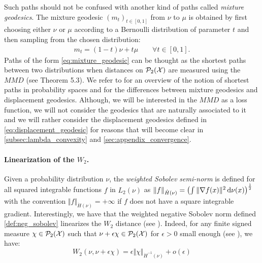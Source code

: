 \begin{remark}
	Such paths should not be confused with another kind of paths called \textit{mixture geodesics}. The mixture geodesic $(m_t)_{t\in[0,1]}$ from $\nu$ to $\mu$ is obtained by first choosing either $\nu$ or $\mu$ according to a Bernoulli distribution of parameter $t$ and then sampling from the chosen distribution:
	\begin{align}\label{eq:mixture_geodesic}
	m_t = (1-t)\nu + t\mu \qquad \forall t \in [0,1].
	\end{align}
	Paths of the form \cref{eq:mixture_geodesic} can be thought as the shortest paths between two distributions when distances on $\mathcal{P}_2({{\mathcal X}})$ are measured using the $MMD$ (see \cite{Bottou:2017} Theorem 5.3). We refer to \cite{Bottou:2017} for an overview of the notion of shortest paths in probability spaces and for the differences between mixture geodesics and displacement geodesics.
	Although, we will be interested in the $MMD$ as a loss function, we will not consider the geodesics that are naturally associated to it and we will rather consider the displacement geodesics defined in \cref{eq:displacement_geodesic} for reasons that will become clear in \cref{subsec:lambda_convexity} and \cref{sec:appendix_convergence}.
\end{remark}


\paragraph{Linearization of the $W_2$.} Given a probability distribution $\nu$, the \textit{weighted Sobolev semi-norm} is defined for all squared integrable functions $f$ in $L_2(\nu)$ as $ \Vert f \Vert_{\dot{H}(\nu)} = \left(\int \Vert \nabla f(x) \Vert^2 \mathop{}\!\mathrm{d} \nu(x) \right)^{\frac{1}{2}}$ with the convention $\Vert f \Vert_{\dot{H}(\nu)} = +\infty$ if $f$ does not have a square integrable gradient. Interestingly, we have that the weighted negative Sobolev norm defined \cref{def:neg_sobolev} linearizes the $W_2$ distance (see \cite{Villani:2009}). Indeed, for any finite signed measure $\chi\in\mathcal{P}_2({{\mathcal X}})$ such that $\nu + \epsilon \chi \in {{\mathcal P}}_2({{\mathcal X}})$ for $\epsilon >0$ small enough (see \cite{Villani:2009}), we have:
\begin{equation}
W_2(\nu, \nu+ \epsilon \chi) = \epsilon \Vert \chi \Vert_{\dot{H}^{-1}(\nu)}+ o(\epsilon)
\end{equation}



